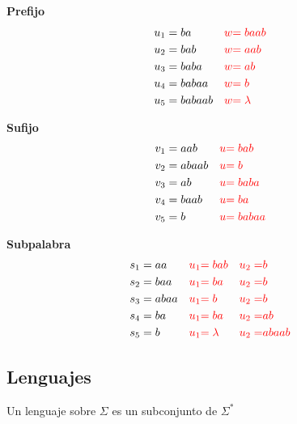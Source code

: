 \begin{multicols}{3}
\centering
\textbf{Prefijo}
\begin{align*}
& u_1 = ba      & {\color{red}w} & {\color{red}= baab} \\
& u_2 = bab     & {\color{red}w} & {\color{red}= aab} \\
& u_3 = baba    & {\color{red}w} & {\color{red}= ab} \\
& u_4 = babaa   & {\color{red}w} & {\color{red}= b} \\
& u_5 = babaab  & {\color{red}w} & {\color{red}= \lambda}
\end{align*}

\columnbreak
\textbf{Sufijo}
\begin{align*}
& v_1 = aab   & {\color{red}u} & {\color{red}= bab} \\
& v_2 = abaab & {\color{red}u} & {\color{red}= b} \\
& v_3 = ab    & {\color{red}u} & {\color{red}= baba} \\
& v_4 = baab  & {\color{red}u} & {\color{red}= ba} \\
& v_5 = b     & {\color{red}u} & {\color{red}= babaa}
\end{align*}

\columnbreak

\textbf{Subpalabra}
\begin{align*}
& s_1 = aa   & {\color{red}u_1} & {\color{red}= bab} & {\color{red}u_2=}&{\color{red}b} \\
& s_2 = baa  & {\color{red}u_1} & {\color{red}= ba}  & {\color{red}u_2=}&{\color{red}b}\\
& s_3 = abaa & {\color{red}u_1} & {\color{red}= b}   & {\color{red}u_2=}&{\color{red}b}\\
& s_4 = ba   & {\color{red}u_1} & {\color{red}= ba}  & {\color{red}u_2=}&{\color{red}ab}\\
& s_5 = b    & {\color{red}u_1} & {\color{red}= \lambda} & {\color{red}u_2=}&{\color{red}abaab}
\end{align*}
\end{multicols}




\subsection{Lenguajes}
Un lenguaje sobre $\Sigma$ es un subconjunto de $\Sigma^*$
